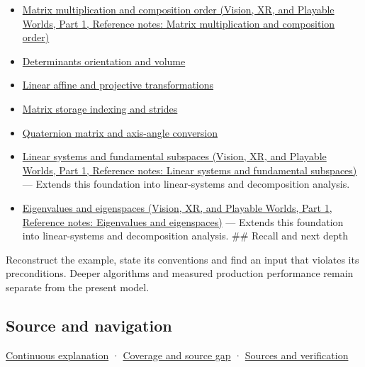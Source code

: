 \hypertarget{appendix-bd39c3bf5d64-used-by}{}

\begin{itemize}
\tightlist
\item
  \href{../07-Vision-XR-and-Playable-Worlds-P01/main.pdf\#appendix-ab31ef447dbf}{Matrix multiplication and composition order (Vision, XR, and Playable Worlds, Part 1, Reference notes: Matrix multiplication and composition order)}
\item
  \hyperref[appendix-da478be01d02]{Determinants orientation and volume}
\item
  \hyperref[appendix-0bf0ca73f735]{Linear affine and projective transformations}
\item
  \hyperref[appendix-ffdc1d4e5350]{Matrix storage indexing and strides}
\item
  \hyperref[appendix-26d8da71f6c4]{Quaternion matrix and axis-angle conversion}
\item
  \href{../07-Vision-XR-and-Playable-Worlds-P01/main.pdf\#appendix-8572a4a060c1}{Linear systems and fundamental subspaces (Vision, XR, and Playable Worlds, Part 1, Reference notes: Linear systems and fundamental subspaces)} --- Extends this foundation into linear-systems and decomposition analysis.
\item
  \href{../07-Vision-XR-and-Playable-Worlds-P01/main.pdf\#appendix-0b3be18411f9}{Eigenvalues and eigenspaces (Vision, XR, and Playable Worlds, Part 1, Reference notes: Eigenvalues and eigenspaces)} --- Extends this foundation into linear-systems and decomposition analysis. \#\# Recall and next depth
\end{itemize}

Reconstruct the example, state its conventions and find an input that violates its preconditions. Deeper algorithms and measured production performance remain separate from the present model.

\subsection{Source and navigation}\label{appendix-bd39c3bf5d64-source-and-navigation}

\hypertarget{appendix-bd39c3bf5d64-source-and-navigation}{}

\hyperref[01-foundations-i-ch018-keep-the-promises-visible-while-moving-between-representations]{Continuous explanation} · \hyperref[appendix-fd090d982a15-phase-7---parts-601-700]{Coverage and source gap} · \hyperref[appendix-a103e7846d21-phase-7---source-analysis-and-verification]{Sources and verification}
